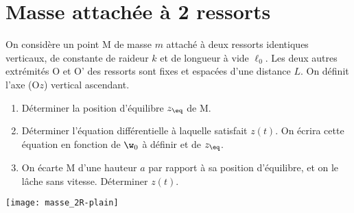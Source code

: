 \documentclass[a4paper, 12pt, final, garamond]{book}
\begin{document}
\section{Masse attachée à 2 ressorts}
\begin{minipage}{0.75\linewidth}
    On considère un point M de masse $m$ attaché à deux ressorts identiques
    verticaux, de constante de raideur $k$ et de longueur à vide $\ell_0$. Les
    deux autres extrémités O et O' des ressorts sont fixes et espacées d'une
    distance $L$. On définit l'axe (O$z$) vertical ascendant. \bigbreak
    \begin{enumerate}
        \item Déterminer la position d'équilibre $z_{\eq}$ de M.
        \item Déterminer l'équation différentielle à laquelle satisfait $z(t)$.
            On écrira cette équation en fonction de $\w_0$ à définir et de
            $z_{\eq}$.
        \item On écarte M d'une hauteur $a$ par rapport à sa position
            d'équilibre, et on le lâche sans vitesse. Déterminer $z(t)$.
    \end{enumerate}
\end{minipage}
\hfill
\begin{minipage}{0.18\linewidth}
    \begin{center}
        \texttt{[image: masse\_2R-plain]}  
    \end{center}
\end{minipage}
\end{document}
